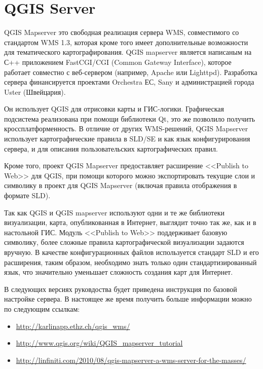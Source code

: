
\chapter{QGIS Server}\label{label_qgisserver}


QGIS Mapserver это свободная реализация сервера WMS, совместимого со стандартом
WMS 1.3, которая кроме того имеет дополнительные возможности для тематического
картографирования. QGIS mapserver является написаным на С++ приложением FastCGI/CGI
(Common Gateway Interface), которое работает совместно с веб-сервером
(например, Apache или Lighttpd). Разработка сервера финансируется проектами
Orchestra ЕС, Sany и администрацией города Uster (Швейцария).

Он использует QGIS для отрисовки карты и ГИС-логики. Графическая подсистема
реализована при помощи библиотеки Qt, это же  позволило получить кроссплатформенность.
В отличие от других WMS-решений, QGIS Mapserver использует картографические
правила в SLD/SE и как язык конфигурирования сервера, и для описания пользовательских
картографических правил.

Кроме того, проект QGIS Mapserver предоставляет расширение <<Publish to Web>>
для QGIS, при помощи которого можно экспортировать текущие слои и символику
в проект для QGIS Mapserver (включая правила отображения в формате SLD).

Так как QGIS и QGIS mapserver используют одни и те же библиотеки визуализации,
карта, опубликованная в Интернет, выглядит точно так же, как и в настольной
ГИС. Модуль <<Publish to Web>> поддерживает базовую символику, более сложные
правила картографической визуализации задаются вручную. В качестве конфигурационных
файлов используется стандарт SLD и его расширения, таким образом, необходимо
знать только один стандартизированный язык, что значительно уменьшает сложность
создания карт для Интернет.

В следующих версиях руковдоства будет приведена инструкция по базовой
настройке сервера. В настоящее же время получить больше информации можно
по следующим ссылкам:

\begin{itemize}
\item \url{http://karlinapp.ethz.ch/qgis\_wms/}
\item \url{http://www.qgis.org/wiki/QGIS\_mapserver\_tutorial}
\item \url{http://linfiniti.com/2010/08/qgis-mapserver-a-wms-server-for-the-masses/}
\end{itemize}

